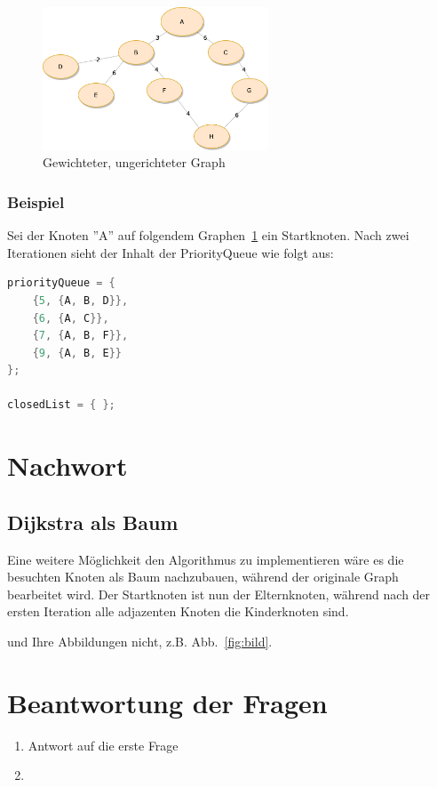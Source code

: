\documentclass[a4paper]{article}
\begin{document}
\begin{figure}[htbp]
	\centering
		\includegraphics[width=0.60\textwidth]{Latex/Figs/Beispielgraph_2.png}		
	\caption{Gewichteter, ungerichteter Graph}
	\label{fig:beispielgraph_2}
\end{figure}

\subsubsection{Beispiel}

Sei der Knoten ''A'' auf folgendem Graphen~\ref{fig:beispielgraph_2} ein Startknoten.
Nach zwei Iterationen sieht der Inhalt der PriorityQueue wie folgt aus:\\

\begin{lstlisting}[language = java, frame = trBL]
priorityQueue = {
    {5, {A, B, D}},
    {6, {A, C}},
    {7, {A, B, F}},
    {9, {A, B, E}}
};

closedList = { };
\end{lstlisting}



\newpage

\section{Nachwort}

\subsection{Dijkstra als Baum}

Eine weitere Möglichkeit den Algorithmus zu implementieren wäre es die besuchten Knoten als Baum nachzubauen, während der originale Graph bearbeitet wird. Der Startknoten ist nun der Elternknoten, während nach der ersten Iteration alle adjazenten Knoten die Kinderknoten sind. 

\cite{KN2012} 
und Ihre Abbildungen nicht, z.B. Abb.~\ref{fig:bild}.
  

\section{Beantwortung der  Fragen}
\begin{enumerate}
						\item Antwort auf die erste Frage
						\item 
					\end{enumerate}




%
\end{document}
